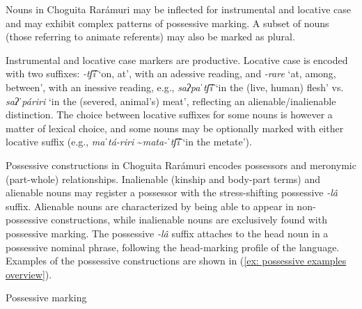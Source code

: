 Nouns in Choguita Rarámuri may be inflected for instrumental and locative case and may exhibit complex patterns of possessive marking. A subset of nouns (those referring to animate referents) may also be marked as plural.

Instrumental and locative case markers are productive. Locative case is encoded with two suffixes: \textit{-tʃ͡í} `on, at', with an adessive reading, and \textit{-rare} ‘at, among, between’, with an inessive reading, e.g., \textit{saʔpaˈtʃ͡í} `in the (live, human)  flesh' vs.\textit{ saʔˈpáriri} `in the (severed, animal's) meat', reflecting an alienable/inalien\-able distinction. The choice between locative suffixes for some nouns is however a matter of lexical choice, and some nouns may be optionally marked with either locative suffix (e.g., \textit{maˈtá-riri} \textasciitilde \textit{mata-ˈtʃ͡í} `in the metate').

Possessive constructions in Choguita Rarámuri encodes possessors and mero\-nym\-ic (part-whole) relationships. Inalienable (kinship and body-part terms) and alienable nouns may register a possessor with the stress-shifting possessive \textit{-lâ} suffix. Alienable nouns are characterized by being able to appear in non-pos\-ses\-sive constructions, while inalienable nouns are exclusively found with possessive marking. The possessive \textit{-lâ} suffix attaches to the head noun in a possessive nominal phrase, following the head-marking profile of the language. Examples of the possessive constructions are shown in (\ref{ex: possessive examples overview}).

\newpage

\ea\label{ex: possessive examples overview}
{Possessive marking}

